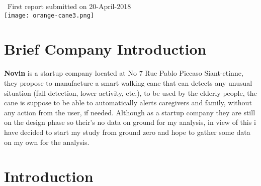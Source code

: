 \documentclass[a4paper, parskip=full]{scrartcl}
\begin{document}
\begin{titlepage}
	
	
	{\large \ First report submitted on 20-April-2018}\\[0.2cm] %
	
	
	\texttt{[image: orange-cane3.png]}\\[0.2cm] %
	
	
	\vfill %
	
\end{titlepage}





\section*{Brief Company Introduction}
\textbf{Novin} is a startup company located at No 7 Rue Pablo Piccaso Siant-etinne, they propose to manufacture a smart walking cane that can detects any unusual situation (fall detection, lower activity, etc.), to be used by the elderly people, the cane is suppose to be able to automatically alerts caregivers and family, without any action from the user, if needed. Although as a startup company they are still on the design phase so their's no data on ground for my analysis, in view of this i have decided to start my study from ground zero and hope to gather some data on my own for the analysis.

 \section*{Introduction}
 
\end{document}
